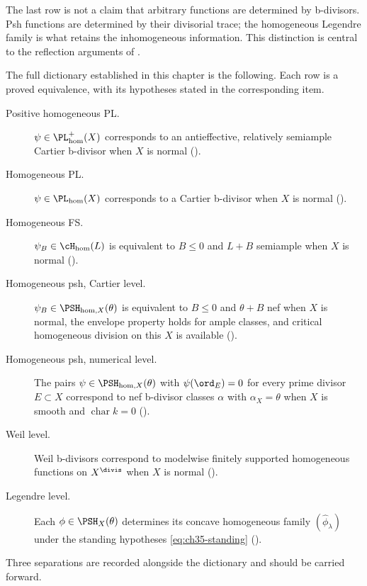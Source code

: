 The last row is not a claim that arbitrary functions are determined by
b-divisors.  Psh functions are determined by their divisorial trace; the
homogeneous Legendre family is what retains the inhomogeneous information.
This distinction is central to the reflection arguments of
.

The full dictionary established in this chapter is the following.  Each row
is a proved equivalence, with its hypotheses stated in the corresponding
item.

\begin{description}
\item[Positive homogeneous PL.]
  $\psi\in\PL^+_{\mathrm{hom}}(X)$ corresponds to an antieffective,
  relatively semiample Cartier b-divisor when $X$ is normal
  ().
\item[Homogeneous PL.]
  $\psi\in\PL_{\mathrm{hom}}(X)$ corresponds to a Cartier b-divisor when
  $X$ is normal ().
\item[Homogeneous FS.]
  $\psi_B\in\cH_{\mathrm{hom}}(L)$ is equivalent to
  $B\leq0$ and $L+B$ semiample when $X$ is normal
  ().
\item[Homogeneous psh, Cartier level.]
  $\psi_B\in\PSH_{\mathrm{hom},X}(\theta)$ is equivalent to
  $B\leq0$ and $\theta+B$ nef when $X$ is normal, the envelope property
  holds for ample classes, and critical homogeneous division on this $X$
  is available
  ().
\item[Homogeneous psh, numerical level.]
  The pairs $\psi\in\PSH_{\mathrm{hom},X}(\theta)$ with
  $\psi(\ord_E)=0$ for every prime divisor $E\subset X$ correspond to nef
  b-divisor classes $\alpha$ with $\alpha_X=\theta$ when $X$ is smooth and
  $\operatorname{char}k=0$
  ().
\item[Weil level.]
  Weil b-divisors correspond to modelwise finitely supported homogeneous
  functions on $X^{\divis}$ when $X$ is normal
  ().
\item[Legendre level.]
  Each $\phi\in\PSH_X(\theta)$ determines its concave homogeneous family
  $(\widehat\phi_\lambda)$ under the standing hypotheses
  \eqref{eq:ch35-standing} ().
\end{description}

Three separations are recorded alongside the dictionary and should be
carried forward.

